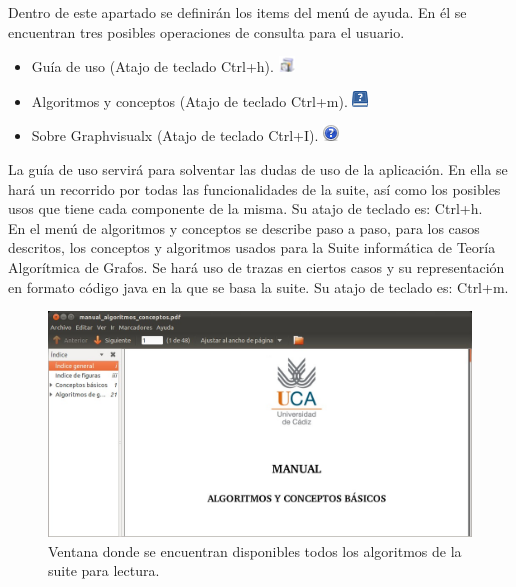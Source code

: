 Dentro de este apartado se definirán los items del menú de ayuda. En él se encuentran tres posibles operaciones de consulta para el usuario.
\begin{itemize}
\item Guía de uso (Atajo de teclado Ctrl+h). \quad \includegraphics[scale=.95]{./imagenes_documentacion/guide.png}
\item Algoritmos y conceptos (Atajo de teclado Ctrl+m). \quad \includegraphics[scale=.9]{./imagenes_documentacion/manual.png}
\item Sobre Graphvisualx (Atajo de teclado Ctrl+I). \quad \includegraphics[scale=.9]{./imagenes_documentacion/about.png}
\end{itemize}

La guía de uso servirá para solventar las dudas de uso de la aplicación. En ella se hará un recorrido por todas las funcionalidades de la suite, así como los posibles usos que tiene cada componente de la misma. Su atajo de teclado es: Ctrl+h. \\

En el menú de algoritmos y conceptos se describe paso a paso, para los casos descritos, los conceptos y algoritmos usados para la Suite informática de Teoría Algorítmica de Grafos. Se hará uso de trazas en ciertos casos y su representación en formato código java en la que se basa la suite. Su atajo de teclado es: Ctrl+m. \\

\begin{figure}[H]
\begin{center}
\includegraphics[width=17cm]{./imagenes_documentacion/imagen_manual_algoritmos.jpeg}
\caption{Ventana donde se encuentran disponibles todos los algoritmos de la suite para lectura.}
\end{center}
\end{figure}


